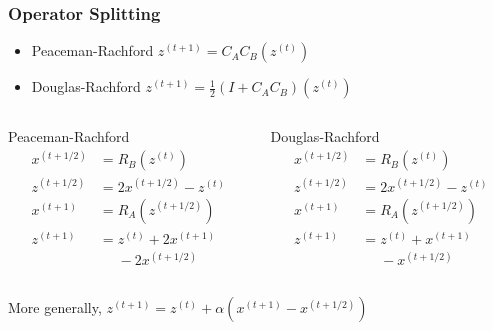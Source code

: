 
\begin{frame}
\frametitle{Operator Splitting}

\begin{itemize}
    \item Peaceman-Rachford $z^{(t+1)} = C_A C_B(z^{(t)})$
    \item Douglas-Rachford $z^{(t+1)} = \frac12(I + C_A C_B)(z^{(t)})$
\end{itemize}

\begin{columns}
\begin{column}{0.4\textwidth}
\begin{block}{Peaceman-Rachford}
\ 
\vspace{-1.3em}
\begin{align*}
x^{(t+1/2)} & = R_B(z^{(t)}) \\
z^{(t+1/2)} & = 2x^{(t+1/2)} - z^{(t)} \\
x^{(t+1)} & = R_A(z^{(t+1/2)}) \\
z^{(t+1)} & = z^{(t)} + 2x^{(t+1)} \\
& \phantom{=} - 2x^{(t+1/2)}
\end{align*}
\end{block}
\end{column}
\begin{column}{0.4\textwidth}
\begin{block}{Douglas-Rachford}
\ 
\vspace{-1.3em}
\begin{align*}
x^{(t+1/2)} & = R_B(z^{(t)}) \\
z^{(t+1/2)} & = 2x^{(t+1/2)} - z^{(t)} \\
x^{(t+1)} & = R_A(z^{(t+1/2)}) \\
z^{(t+1)} & = z^{(t)} + x^{(t+1)} \\
& \phantom{=} - x^{(t+1/2)}
\end{align*}
\end{block}
\end{column}
\end{columns}

More generally, $z^{(t+1)} = z^{(t)} + \alpha (x^{(t+1)} - x^{(t+1/2)})$

\end{frame}


